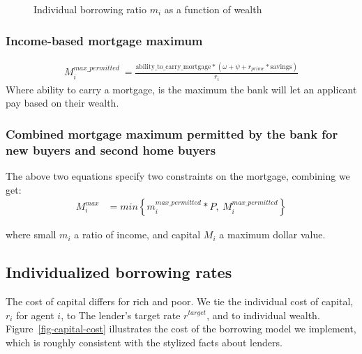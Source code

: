 {%

\begin{figure}[htb]
\begin{center}

\end{center}
\caption{Individual borrowing ratio $m_i$ as a function of wealth}
\label{fig-individual-borrowing-rate}
\end{figure}


\subsubsection{Income-based mortgage maximum}

\begin{align}M^{max\_permitted}_i\ = \frac{\mathrm{ability\_to\_carry\_mortgage}*(\omega+\psi+ r_{prime}* \mathrm{savings})}{r_i}\end{align}\label{eqn-income-based-mortgage}
Where ability to carry a mortgage, is the maximum the bank will let an applicant pay based on their wealth.
 
\subsubsection{Combined mortgage maximum permitted by the bank for new buyers and second home buyers}

The above  two equations specify two constraints on the mortgage,  combining we get:
\begin{align} 
M_i^{max} &= min \left\{ m_i^{max\_permitted}*P, \ M^{max\_permitted}_i \right\} 
\label{eqn-max-mortgage-combined}
\end{align}

where small $m_i$ a ratio of income, and capital $M_i$ a maximum dollar value.




\subsection{Individualized borrowing rates} \label{section-borowing-rate}

The cost of capital differs for rich and poor. We tie the individual cost of capital,  $r_i$ for agent $i$, to The lender's target rate $r^{target}$, and to individual wealth. Figure~\ref{fig-capital-cost} illustrates the cost of the borrowing model we implement, which is  roughly consistent  with the stylized facts about lenders. 
 
}
